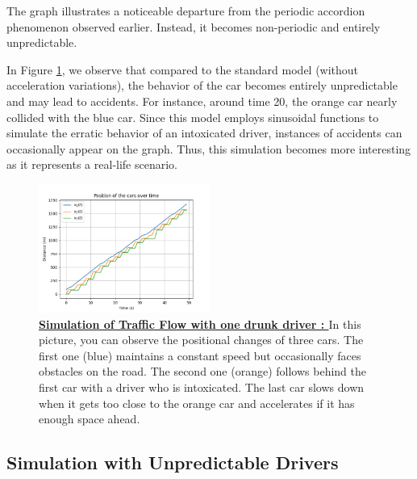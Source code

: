 \documentclass{article}
\begin{document}
		The graph illustrates a noticeable departure from the periodic accordion phenomenon observed earlier. Instead, it becomes non-periodic and entirely unpredictable.
		
		In Figure \ref{fig:Model1W3C_O_Aco_D2}, we observe that compared to the standard model (without acceleration variations), the behavior of the car becomes entirely unpredictable and may lead to accidents. For instance, around time 20, the orange car nearly collided with the blue car. Since this model employs sinusoidal functions to simulate the erratic behavior of an intoxicated driver, instances of accidents can occasionally appear on the graph. Thus, this simulation becomes more interesting as it represents a real-life scenario.
		
		\begin{figure}[H]
			\centering
			\includegraphics[width=0.5\textwidth]{Model1W3C_O_Aco_D2.png}
			\caption[Simulation of Traffic Flow with one drunk driver.]{\textbf{\underline{Simulation of Traffic Flow with one drunk driver : }} In this picture, you can observe the positional changes of three cars. The first one (blue) maintains a constant speed but occasionally faces obstacles on the road. The second one (orange) follows behind the first car with a driver who is intoxicated. The last car slows down when it gets too close to the orange car and accelerates if it has enough space ahead.}
			\label{fig:Model1W3C_O_Aco_D2}
		\end{figure}
		
		\subsection{Simulation with Unpredictable Drivers}
		
\end{document}
